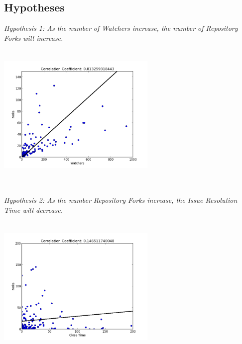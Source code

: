 \documentclass{proc}
\begin{document}
\subsection{Hypotheses}
\emph{Hypothesis 1: As the number of Watchers increase, the number of Repository Forks will increase.}\\
\includegraphics[height=3in,width=3in]{images/watcher_forks_scatterplot.png}

\emph{Hypothesis 2: As the number Repository Forks increase, the Issue Resolution Time will decrease.}\\
\includegraphics[height=3in,width=3in]{images/issue_close_time_forks_scatterplot.png}
\end{document}
